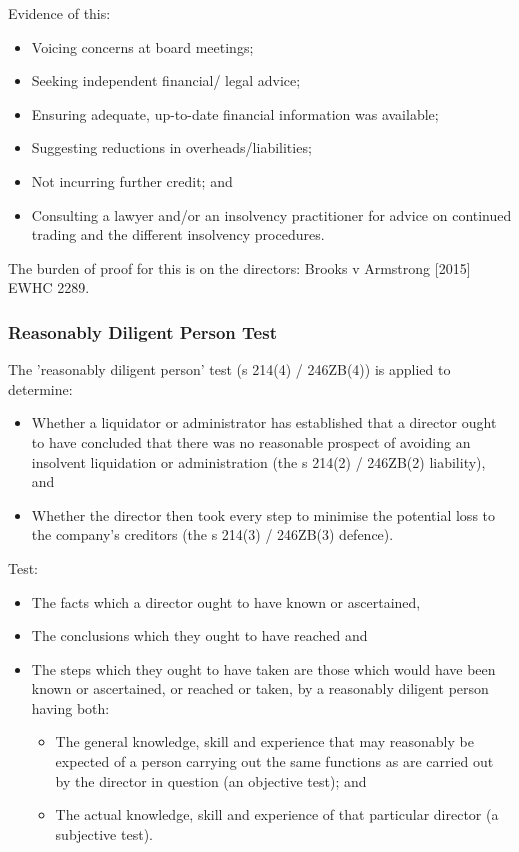 \documentclass[
]{article}
\providecommand{\tightlist}{%
  \setlength{\itemsep}{0pt}\setlength{\parskip}{0pt}}
\begin{document}
Evidence of this:

\begin{itemize}
\tightlist
\item
  Voicing concerns at board meetings;
\item
  Seeking independent financial/ legal advice;
\item
  Ensuring adequate, up-to-date financial information was available;
\item
  Suggesting reductions in overheads/liabilities;
\item
  Not incurring further credit; and
\item
  Consulting a lawyer and/or an insolvency practitioner for advice on
  continued trading and the different insolvency procedures.
\end{itemize}

The burden of proof for this is on the directors: Brooks v Armstrong
{[}2015{]} EWHC 2289.

\hypertarget{reasonably-diligent-person-test}{%
\subsubsection{Reasonably Diligent Person
Test}\label{reasonably-diligent-person-test}}

The 'reasonably diligent person' test (s 214(4) / 246ZB(4)) is applied
to determine:

\begin{itemize}
\tightlist
\item
  Whether a liquidator or administrator has established that a director
  ought to have concluded that there was no reasonable prospect of
  avoiding an insolvent liquidation or administration (the s 214(2) /
  246ZB(2) liability), and
\item
  Whether the director then took every step to minimise the potential
  loss to the company's creditors (the s 214(3) / 246ZB(3) defence).
\end{itemize}

Test:

\begin{itemize}
\tightlist
\item
  The facts which a director ought to have known or ascertained,
\item
  The conclusions which they ought to have reached and
\item
  The steps which they ought to have taken are those which would have
  been known or ascertained, or reached or taken, by a reasonably
  diligent person having both:

  \begin{itemize}
  \tightlist
  \item
    The general knowledge, skill and experience that may reasonably be
    expected of a person carrying out the same functions as are carried
    out by the director in question (an objective test); and
  \item
    The actual knowledge, skill and experience of that particular
    director (a subjective test).
  \end{itemize}
\end{itemize}
\end{document}
